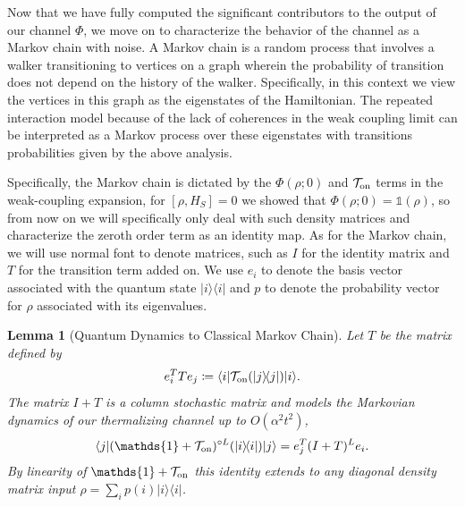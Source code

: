 \documentclass[
 amsmath,amssymb,
 aps,
onecolumn, 
nofootinbib]{revtex4-2}
\newtheorem{lemma}[theorem]{Lemma}
\newcommand{\on}{\rm on}
\newcommand{\ket}[1]{|#1\rangle}
\newcommand{\bra}[1]{\langle #1|}
\newcommand{\ketbra}[2]{| #1\rangle\! \langle #2|}
\newcommand{\bigo}[1]{O\left(#1\right)}
\newcommand{\identity}{\mathds{1}}
\begin{document}
Now that we have fully computed the significant contributors to the output of our channel $\Phi$, we move on to characterize the behavior of the channel as a Markov chain with noise. 
A Markov chain is a random process that involves a walker transitioning to vertices on a graph wherein the probability of transition does not depend on the history of the walker.  Specifically, in this context we view the vertices in this graph as the eigenstates of the Hamiltonian.  The repeated interaction model because of the lack of coherences in the weak coupling limit can be interpreted as a Markov process over these eigenstates with transitions probabilities given by the above analysis. 

Specifically, the Markov chain is dictated by the $\Phi(\rho; 0)$ and $\mathcal{T}_{\on}$ terms in the weak-coupling expansion, for $[\rho, H_S] = 0$ we showed that $\Phi(\rho; 0) = \identity(\rho)$, so from now on we will specifically only deal with such density matrices and characterize the zeroth order term as an identity map. As for the Markov chain, we will use normal font to denote matrices, such as $I$ for the identity matrix and $T$ for the transition term added on. We use $e_i$ to denote the basis vector associated with the quantum state $\ketbra{i}{i}$ and $p$ to denote the probability vector for $\rho$ associated with its eigenvalues.
\begin{lemma}[Quantum Dynamics to Classical Markov Chain] \label{lem:quantum_to_classical}
    Let $T$ be the matrix defined by 
    \begin{equation}
        e_i^T T e_j \coloneqq \bra{i} \mathcal{T}_{\on}(\ketbra{j}{j}) \ket{i}.
    \end{equation}
    The matrix $I + T$ is a column stochastic matrix and models the Markovian dynamics of our thermalizing channel up to $\bigo{\alpha^2 t^2}$,
    \begin{equation}
        \bra{j} (\identity + \mathcal{T}_{\on})^{\circ L} (\ketbra{i}{i}) \ket{j} = e_j^T (I + T)^L e_i.
    \end{equation}
    By linearity of $\identity + \mathcal{T}_{\on}$ this identity extends to any diagonal density matrix input $\rho = \sum_i p(i) \ketbra{i}{i}$.
\end{lemma}
\end{document}
